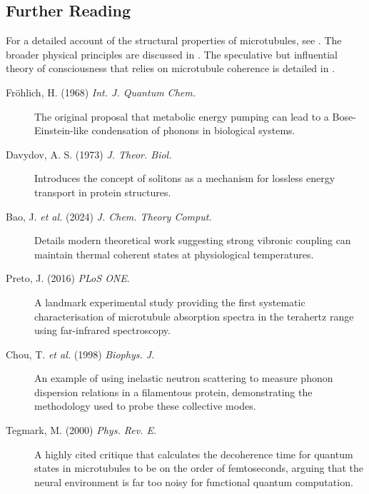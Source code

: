 \begin{importantbox}
\section*{Further Reading}
For a detailed account of the structural properties of microtubules, see . The broader physical principles are discussed in . The speculative but influential theory of consciousness that relies on microtubule coherence is detailed in .

\begin{description}
    \item[Fröhlich, H. (1968) \textit{Int. J. Quantum Chem.}] The original proposal that metabolic energy pumping can lead to a Bose-Einstein-like condensation of phonons in biological systems.
    \item[Davydov, A. S. (1973) \textit{J. Theor. Biol.}] Introduces the concept of solitons as a mechanism for lossless energy transport in protein structures.
    \item[Bao, J. \textit{et al.} (2024) \textit{J. Chem. Theory Comput.}] Details modern theoretical work suggesting strong vibronic coupling can maintain thermal coherent states at physiological temperatures.
\end{description}

\begin{description}
    \item[Preto, J. (2016) \textit{PLoS ONE}.] A landmark experimental study providing the first systematic characterisation of microtubule absorption spectra in the terahertz range using far-infrared spectroscopy.
    \item[Chou, T. \textit{et al.} (1998) \textit{Biophys. J.}] An example of using inelastic neutron scattering to measure phonon dispersion relations in a filamentous protein, demonstrating the methodology used to probe these collective modes.
\end{description}

\begin{description}
    \item[Tegmark, M. (2000) \textit{Phys. Rev. E}.] A highly cited critique that calculates the decoherence time for quantum states in microtubules to be on the order of femtoseconds, arguing that the neural environment is far too noisy for functional quantum computation.
\end{description}
\end{importantbox}